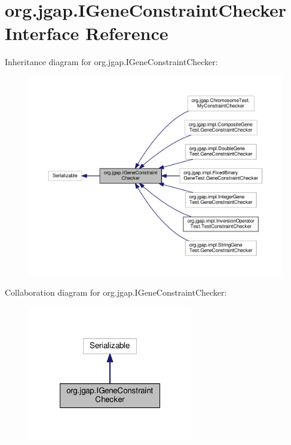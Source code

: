 \hypertarget{interfaceorg_1_1jgap_1_1_i_gene_constraint_checker}{\section{org.\-jgap.\-I\-Gene\-Constraint\-Checker Interface Reference}
\label{interfaceorg_1_1jgap_1_1_i_gene_constraint_checker}
}


Inheritance diagram for org.\-jgap.\-I\-Gene\-Constraint\-Checker\-:
\nopagebreak
\begin{figure}[H]
\begin{center}
\leavevmode
\includegraphics[width=350pt]{interfaceorg_1_1jgap_1_1_i_gene_constraint_checker__inherit__graph}
\end{center}
\end{figure}


Collaboration diagram for org.\-jgap.\-I\-Gene\-Constraint\-Checker\-:
\nopagebreak
\begin{figure}[H]
\begin{center}
\leavevmode
\includegraphics[width=204pt]{interfaceorg_1_1jgap_1_1_i_gene_constraint_checker__coll__graph}
\end{center}
\end{figure}
